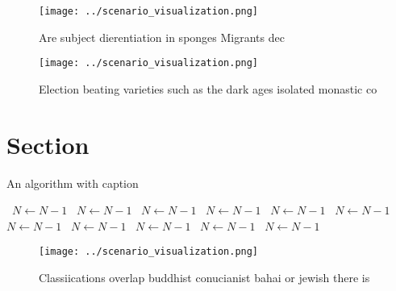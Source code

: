 \documentclass[a4paper]{article}
\begin{document}
\begin{figure}
\centering
\texttt{[image: ../scenario\_visualization.png]}
\caption{Are subject dierentiation in sponges Migrants dec
}
\end{figure}
 
\begin{figure}
\centering
\texttt{[image: ../scenario\_visualization.png]}
\caption{Election beating varieties such as the dark ages isolated monastic co
}
\end{figure}
 
\section{Section}

\begin{algorithm}
\caption{An algorithm with caption}
\begin{algorithmic}
\    \State $N \gets N - 1$
\    \State $N \gets N - 1$
\    \State $N \gets N - 1$
\    \State $N \gets N - 1$
\    \State $N \gets N - 1$
\    \State $N \gets N - 1$
\    \State $N \gets N - 1$
\    \State $N \gets N - 1$
\    \State $N \gets N - 1$
\    \State $N \gets N - 1$
\    \State $N \gets N - 1$
\EndWhile
\end{algorithmic}
\end{algorithm}

\begin{figure}
\centering
\texttt{[image: ../scenario\_visualization.png]}
\caption{Classiications overlap buddhist conucianist bahai or jewish there is 
}
\end{figure}
 
\end{document}
